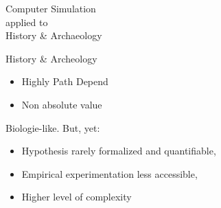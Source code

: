 \documentclass[12pt, notes=show,handout=no]{beamer}
\begin{document}
%

\begin{frame}
    \begin{center}
	\Huge
	Computer Simulation \\ applied to\\  History \& Archaeology
    \end{center}
\end{frame}


\begin{frame}{History \& Archeology}

    \begin{itemize}
	\item <3-> Highly Path Depend
	\item <4-> Non absolute value
    \end{itemize}
    
    Biologie-like. But, yet:
    \begin{itemize}
	\item<5-> Hypothesis rarely formalized and quantifiable, 
	\item<6-> Empirical experimentation less accessible,
	\item<7-> Higher level of complexity
    \end{itemize}
\end{frame}

\end{document}
